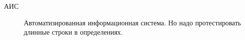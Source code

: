 \Abbreviations
\begin{description}
\item[АИС] Автоматизированная информационная система. Но надо протестировать длинные строки в определениях.
\end{description}
